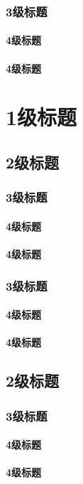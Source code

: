 \subsection{3级标题}
\subsubsection{4级标题}
\subsubsection{4级标题}

\chapter{1级标题}
\section{2级标题}
\subsection{3级标题}
\subsubsection{4级标题}
\subsubsection{4级标题}
\subsection{3级标题}
\subsubsection{4级标题}
\subsubsection{4级标题}
\section{2级标题}
\subsection{3级标题}
\subsubsection{4级标题}
\subsubsection{4级标题}

